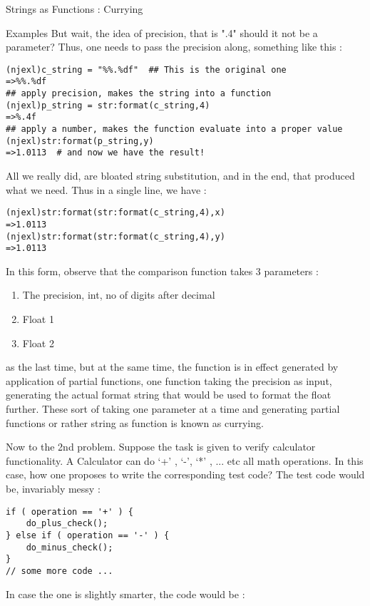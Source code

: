 \begin{section}{Strings as Functions : Currying}
\begin{subsection}{Examples}
But wait, the idea of precision, that is ".4" should it not be a parameter? 
Thus, one needs to pass the precision along, something like this :

\begin{lstlisting}[style=all]
(njexl)c_string = "%%.%df"  ## This is the original one 
=>%%.%df
## apply precision, makes the string into a function 
(njexl)p_string = str:format(c_string,4) 
=>%.4f
## apply a number, makes the function evaluate into a proper value
(njexl)str:format(p_string,y)  
=>1.0113  # and now we have the result!
\end{lstlisting}

All we really did, are bloated string substitution, and in the end, that produced what we need. 
Thus in a single line, we have :

\begin{lstlisting}[style=all]
(njexl)str:format(str:format(c_string,4),x)
=>1.0113
(njexl)str:format(str:format(c_string,4),y)
=>1.0113
\end{lstlisting}

In this form, observe that the comparison function takes 3 parameters :
\begin{enumerate}
\item{ The precision, int, no of digits after decimal }
\item{ Float 1 }
\item{ Float 2 }
\end{enumerate}

as the last time, but at the same time, the function is in effect generated by application of partial functions, one function taking the precision as input, generating the actual format string that would be used to format the float further. These sort of taking one parameter at a time and generating partial functions or rather string as function is known as currying.

Now to the 2nd problem.
Suppose the task is given to verify calculator functionality. 
A Calculator can do `+' , `-', `*' , ... etc all math operations. 
In this case, how one proposes to write the corresponding test code?
The test code would be, invariably messy :

\begin{lstlisting}[style=JexlStyle]
if ( operation == '+' ) {
    do_plus_check();
} else if ( operation == '-' ) {
    do_minus_check();
}
// some more code ...
\end{lstlisting}

In case the one is slightly smarter, the code would be :


\end{subsection}
\end{section}
